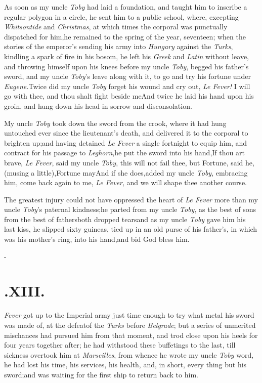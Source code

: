 \documentclass{article}
\begin{document}
As soon as my uncle \textit{Toby} had laid a foundation, and
taught him to inscribe a regular polygon in a circle, he sent him
to a public school, where, excepting \textit{Whitsontide} and
\textit{Christmas}, at which times the corporal was punctually
dispatched for him,\tsk he remained to the spring of the year,
seventeen; when the stories of the emperor’s sending his army
into \textit{Hungary} against the \textit{Turks}, kindling a spark of
fire in his bosom, he left his \textit{Greek} and \textit{Latin}
without leave, and throwing himself upon his knees before my uncle
\textit{Toby}, begged his father’s sword, and my uncle
\textit{Toby}’s leave along with it, to go and try his fortune
under \textit{Eugene.}\tsk Twice did my uncle \textit{Toby} forget
his wound and cry out, \textit{Le Fever!} I will go with thee, and
thou shalt fight beside me\tsh And twice he laid his hand
upon his groin, and hung down his head in sorrow and
disconsolation.\tsh

My uncle \textit{Toby} took down the sword from the
crook, where it had hung untouched ever since the
lieutenant’s death, and delivered it to the corporal to
brighten up;\tsh and having detained \textit{Le Fever} a
single fortnight to equip him, and contract for his passage to
\textit{Leghorn},\break\tsk he put the sword into his
hand,\tsh If thou art brave, \textit{Le Fever}, said my
uncle \textit{Toby}, this will not fail thee,\tsh{} but
Fortune, said he, (musing a little),\break\tsh Fortune
may\tsh And if she does,\break\tsk added my uncle \textit{Toby},
embracing him, come back again to me, \textit{Le Fever}, and we will
shape thee another course.

The greatest injury could not have oppressed the heart of \textit{Le
Fever} more than my uncle \textit{Toby}’s paternal
kindness;\tsh he parted from my uncle \textit{Toby}, as the
best of sons from the best of fathers\tsh\break both dropped
tears\tsh and as my uncle \textit{Toby} gave him his last
kiss, he slipped sixty guineas, tied up in an old purse of his
father’s, in which was his mother’s ring, into his
hand,\tsk and bid God bless him.

\vfill{}\eject
\null\kern-\baselineskip
\section{.\enspace XIII.}

 \textit{Fever} got up to the
Imperial army just time enough to try what metal his sword was made
of, at the defeat\break of the \textit{Turks} before \textit{Belgrade}; but a
series of unmerited mischances had pursued him from that moment,
and trod close upon his heels for four years together after; he had
withstood these buffetings to the last, till sickness overtook him
at \textit{Marseilles}, from whence he wrote my uncle \textit{Toby}
word, he had lost his time, his services, his health, and, in
short, every thing but his sword;\tsh\break and was waiting for
the first ship to return back to him.
\end{document}
